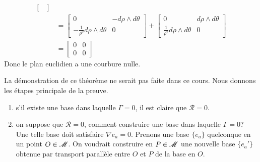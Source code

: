 \documentclass[a4paper,11pt]{report}
\begin{document}
\begin{exmp}
\begin{align}
\begin{bmatrix}
                        \end{bmatrix}\\
                        &= \begin{bmatrix}
                            0 & -d\rho\wedge d\theta \\
                            -\frac{1}{\rho^2}d\rho\wedge d\theta & 0
                        \end{bmatrix}+
                        \begin{bmatrix}
                            0 & d\rho\wedge d\theta \\
                            \frac{1}{\rho^2}d\rho\wedge d\theta & 0
                        \end{bmatrix}\\
                        &= 
                        \begin{bmatrix}
                            0 & 0 \\
                            0 & 0
                        \end{bmatrix}
                    \end{align}
                    Donc le plan euclidien a une courbure nulle.
                \end{exmp}
                
                La démonstration de ce théorème ne serait pas faite dans ce cours. Nous donnons les étapes principale de la preuve.
                \begin{enumerate}[label = \textit{\roman*)}]
                    \item s'il existe une base dans laquelle $\Gamma = 0$, il est claire que $\mathscr{R} = 0$.
                    \item on suppose que $\mathscr{R} = 0$, comment construire une base dans laquelle $\Gamma = 0$?  Une telle base doit satisfaire $\nabla e_a = 0$. Prenons une base $\{e_a\}$ quelconque en un point $O\in\mathscr{M}$. On voudrait construire en $P\in\mathscr{M}$ une nouvelle base $\{e_a'\}$ obtenue par transport parallèle entre $O$ et $P$ de la base en $O$. 
                \end{enumerate}
                
\end{document}
